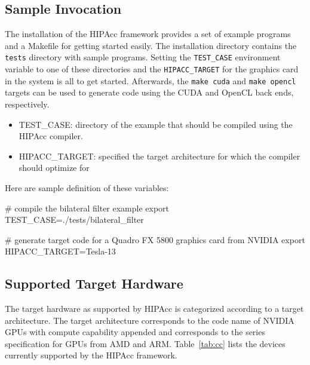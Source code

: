 \subsection{Sample Invocation}
The installation of the \ac{HIPAcc} framework provides a set of example programs and a Makefile for getting started easily.
The installation directory contains the \verb|tests| directory with sample programs.
Setting the {\tt TEST\_CASE} environment variable to one of these directories and the {\tt HIPACC\_TARGET} for the graphics card in the system is all to get started.
Afterwards, the \verb|make cuda| and \verb|make opencl| targets can be used to generate code using the CUDA and OpenCL back ends, respectively.

\begin{itemize}
    \item TEST\_CASE: directory of the example that should be compiled using the
    \ac{HIPAcc} compiler.
    \item HIPACC\_TARGET: specified the target architecture for which the compiler should optimize for
\end{itemize}

Here are sample definition of these variables:
\begin{code}
# compile the bilateral filter example
export TEST_CASE=./tests/bilateral_filter

# generate target code for a Quadro FX 5800 graphics card from NVIDIA
export HIPACC_TARGET=Tesla-13
\end{code}

\subsection{Supported Target Hardware}
The target hardware as supported by \ac{HIPAcc} is categorized according to a
target architecture. The target architecture corresponds to the code name of
NVIDIA GPUs with compute capability appended and corresponds to the series
specification for GPUs from AMD and ARM. Table~\ref{tab:cc} lists the devices
currently supported by the \ac{HIPAcc} framework.

